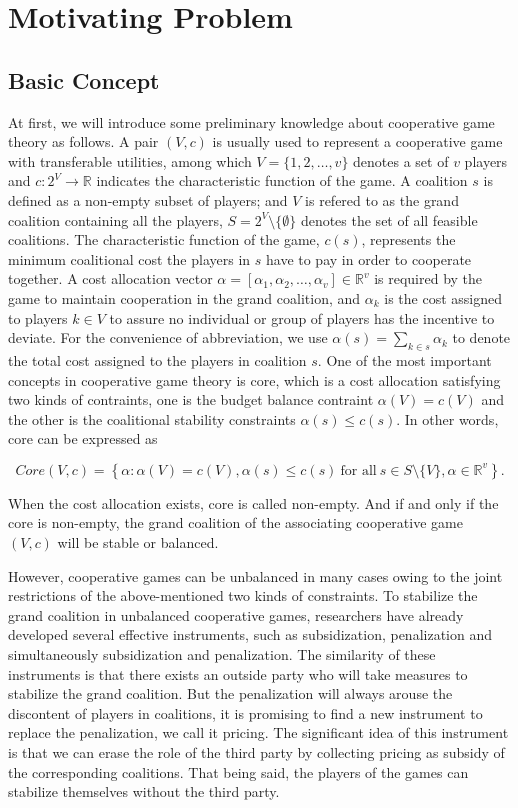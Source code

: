\section{Motivating Problem}

\subsection{Basic Concept}

At first, we will introduce some preliminary knowledge about cooperative game theory as follows.
A pair $(V,c)$ is usually used to represent a cooperative game with transferable utilities, among which $V=\{1,2,\dots,v\}$ denotes a set of $v$ players and $c:2^{V}\to \mathbb{R}$ indicates the characteristic function of the game. A coalition $s$ is defined as a non-empty subset of players; and $V$ is refered to as the grand coalition containing all the players, $S=2^{V} \setminus\{\emptyset\}$ denotes the set of all feasible coalitions. The characteristic function of the game, $c(s)$, represents the minimum coalitional cost the players in $s$ have to pay in order to cooperate together.
A cost allocation vector $\alpha=[\alpha_{1},\alpha_{2},\dots,\alpha_{v}] \in \mathbb{R}^{v}$ is required by the game to maintain cooperation in the grand coalition, and $\alpha_{k}$ is the cost assigned to players $k \in V$ to assure no individual or group of players has the incentive to deviate. For the convenience of abbreviation, we use $\alpha(s)=\sum_{k\in{s}}\alpha_{k}$ to denote the total cost assigned to the players in coalition $s$.
One of the most important concepts in cooperative game theory is core, which is a cost allocation satisfying two kinds of contraints, one is the budget balance contraint {$\alpha(V)=c(V)$} and the other is the coalitional stability constraints {$\alpha(s) \leq c(s)$}. In other words, core can be expressed as

\[
Core(V,c)= \left\{\alpha:\alpha(V)=c(V), \alpha(s)\leq c(s)\ \text{for all}\ s \in S \setminus\{V\}, \alpha \in \mathbb{R}^{v} \right\}.
\]

When the cost allocation exists, core is called non-empty. And if and only if the core is non-empty, the grand coalition of the associating cooperative game $(V,c)$ will be stable or balanced.

However, cooperative games can be unbalanced in many cases owing to the joint restrictions of the above-mentioned two kinds of constraints. To stabilize the grand coalition in unbalanced cooperative games, researchers have already developed several effective instruments, such as subsidization, penalization and simultaneously subsidization and penalization. The
similarity of these instruments is that there exists an outside party who will take measures to stabilize the grand coalition. But the penalization will always arouse the discontent of players in coalitions, it is promising to find a new instrument to replace the penalization, we call it pricing.
The significant idea of this instrument is that we can erase the role of the third party by collecting pricing as subsidy of the corresponding coalitions.
That being said, the players of the games can stabilize themselves without the third party.

